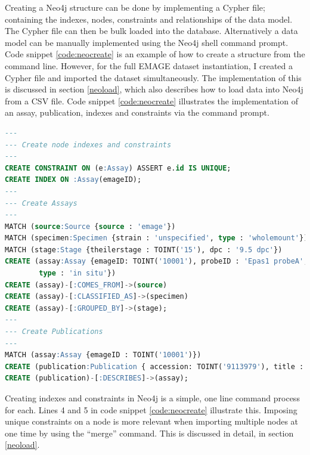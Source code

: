 Creating a Neo4j structure can be done by implementing a Cypher file; containing the indexes, nodes, constraints and relationships of the data model. The Cypher file can then be bulk loaded into the database. Alternatively a data model can be manually implemented using the Neo4j shell command prompt. Code snippet \ref{code:neocreate} is an example of how to create a structure from the command line. However, for the full EMAGE dataset instantiation, I created a Cypher file and imported the dataset simultaneously. The implementation of this is discussed in section \ref{neoload}, which also describes how to load data into Neo4j from a CSV file. Code snippet \ref{code:neocreate} illustrates the implementation of an assay, publication, indexes and constraints via the command prompt.
\newpage
\vspace*{\fill}
\begin{lstlisting}[language=SQL, caption=Example creation of an assay\, publication\, indexes and constraints in Neo4j., label=code:neocreate]
---
--- Create node indexes and constraints
---
CREATE CONSTRAINT ON (e:Assay) ASSERT e.id IS UNIQUE;
CREATE INDEX ON :Assay(emageID);
---
--- Create Assays
---
MATCH (source:Source {source : 'emage'})
MATCH (specimen:Specimen {strain : 'unspecified', type : 'wholemount'})
MATCH (stage:Stage {theilerstage : TOINT('15'), dpc : '9.5 dpc'})
CREATE (assay:Assay {emageID: TOINT('10001'), probeID : 'Epas1 probeA',
		type : 'in situ'})
CREATE (assay)-[:COMES_FROM]->(source)
CREATE (assay)-[:CLASSIFIED_AS]->(specimen)
CREATE (assay)-[:GROUPED_BY]->(stage);
---
--- Create Publications
---
MATCH (assay:Assay {emageID : TOINT('10001')})
CREATE (publication:Publication { accession: TOINT('9113979'), title : 'A novel bHLH-PAS factor with close sequence similarity to hypoxia-inducible factor 1alpha regulates the VEGF expression and is potentially involved in lung and vascular development.', author : 'Ema M, Taya S, Yokotani N, Sogawa K, Matsuda Y, Fujii-Kuriyama Y'})
CREATE (publication)-[:DESCRIBES]->(assay);
\end{lstlisting}
\vspace*{\fill}
\newpage

Creating indexes and constraints in Neo4j is a simple, one line command process for each. Lines 4 and 5 in code snippet \ref{code:neocreate} illustrate this. Imposing unique constraints on a node is more relevant when importing multiple nodes at one time by using the ``merge'' command. This is discussed in detail, in section \ref{neoload}.

